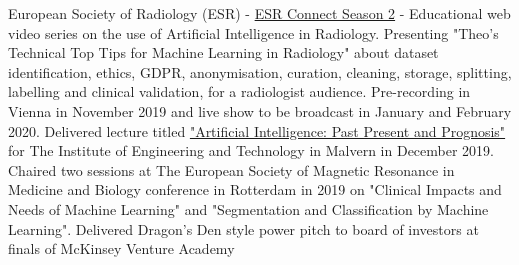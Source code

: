 %
%
%


\begin{scholarship}
					{European Society of Radiology (ESR) - \href{https://connect.myesr.org/}{ESR Connect Season 2}
					 - Educational web video series on the use of Artificial Intelligence in Radiology.
					 Presenting "Theo's Technical Top Tips for Machine Learning in Radiology" about dataset identification,
					 ethics, GDPR, anonymisation, curation, cleaning, storage, splitting, labelling and clinical validation, for a radiologist audience.
					 Pre-recording in Vienna in November 2019 and live show to be broadcast in January and February 2020.
					 }
					{Delivered lecture titled {\color{linkcolor}\href{https://communities.theiet.org/communities/events/item/155/77/23766}{"Artificial Intelligence: Past Present and Prognosis"}} for The Institute of
					 Engineering and Technology in Malvern in December 2019.}
					{Chaired two sessions at The European Society of Magnetic Resonance in Medicine and Biology conference
					 in Rotterdam in 2019 on "Clinical Impacts and Needs of Machine Learning" and
					 "Segmentation and Classification by Machine Learning".}
					{Delivered Dragon's Den style power pitch to board of investors at finals of McKinsey Venture Academy}

	\emptySeparator
\end{scholarship}